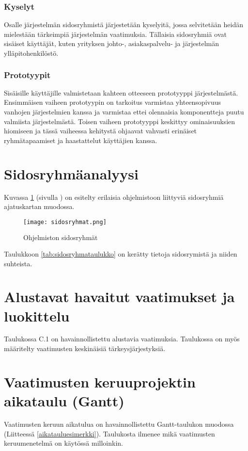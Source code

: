         \subsubsection{Kyselyt}

        Osalle järjestelmän sidosryhmistä järjestetään kyselyitä, jossa selvitetään heidän mielestään tärkeimpiä järjestelmän vaatimuksia.
        Tällaisia sidosryhmiä ovat sisäiset käyttäjät, kuten yrityksen johto-, asiakaspalvelu- ja järjestelmän ylläpitohenkilöstö.

        \subsubsection*{Prototyypit}

        Sisäisille käyttäjille valmistetaan kahteen otteeseen prototyyppi järjestelmästä. Ensimmäisen vaiheen prototyypin on tarkoitus varmistaa yhteensopivuus vanhojen järjestelmien kanssa ja varmistaa ettei olennaisia komponentteja puutu valmiista järjestelmästä. Toisen vaiheen prototyyppi keskittyy ominaisuuksien hiomiseen ja tässä vaiheessa kehitystä ohjaavat vahvasti erinäiset ryhmätapaamiset ja haastattelut käyttäjien kanssa.
	
\section{Sidosryhmäanalyysi}

        Kuvassa \ref{img:sidosryhmat} (sivulla \pageref{img:sidosryhmat}) on esitelty erilaisia ohjelmistoon liittyviä sidosryhmiä ajatuskartan muodossa.

        \begin{figure}[H] %
		\centering
		\texttt{[image: sidosryhmat.png]}
		\caption{Ohjelmiston sidosryhmät} %
		\label{img:sidosryhmat}
	\end{figure}

	Taulukkoon \ref{tab:sidosryhmataulukko} on kerätty tietoja sidosrymistä ja niiden suhteista.

\section{Alustavat havaitut vaatimukset ja luokittelu}
Taulukossa C.1 on havainnollistettu alustavia vaatimuksia. Taulukossa on myös määritelty vaatimusten keskinäisiä tärkeysjärjestyksiä.

    
\section{Vaatimusten keruuprojektin aikataulu (Gantt)}

	Vaatimusten keruun aikatulua on havainnollistettu Gantt-taulukon muodossa (Liitteessä \ref{aikatauluesimerkki}). Taulukosta ilmenee mikä vaatimusten keruumenetelmä on käytössä milloinkin.

